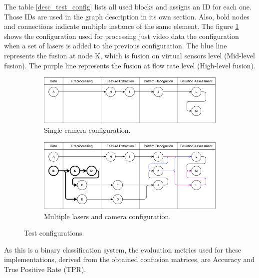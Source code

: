 The table \ref{desc_test_config} lists all used blocks and assigns an ID for each one. Those IDs are used in the graph description in its own section. Also, bold nodes and connections indicate multiple instance of the same element. The figure \ref{tconf2} shows the  configuration used for processing just video data the configuration when a set of lasers is added to the previous configuration. The blue line represents the fusion at node K, which is fusion on virtual sensors level (Mid-level fusion). The purple line represents the fusion at flow rate level (High-level fusion).

\begin{figure}[ht!]

\begin{subfigure}{\textwidth}

\includegraphics[scale=0.6]{fig/4/test_configuration1.pdf}
\caption{Single camera configuration.}
\end{subfigure}


\begin{subfigure}{\textwidth}
\includegraphics[scale=0.6]{fig/4/test_configuration2.pdf}
\caption{Multiple lasers and camera configuration.}

\end{subfigure}
\caption{Test configurations.}
\label{tconf2}
\end{figure}

As this is a binary classification system, the evaluation metrics used for these implementations, derived from the obtained confusion matrices, are Accuracy and True Positive Rate (TPR).

